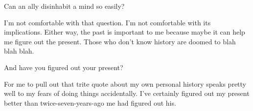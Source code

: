 \begin{paracol}{2}
\begin{leftcolumn}
\begin{ally}
Can an ally disinhabit a mind so easily?
\end{ally}
I'm not comfortable with that question. I'm not comfortable with its implications. Either way, the past is important to me because maybe it can help me figure out the present. Those who don't know history are doomed to blah blah blah.

\begin{ally}
And have you figured out your present?
\end{ally}
For me to pull out that trite quote about my own personal history speaks pretty well to my fears of doing things accidentally. I've certainly figured out my present better than twice-seven-years-ago me had figured out his.

\newpage
\end{leftcolumn}
\end{paracol}
